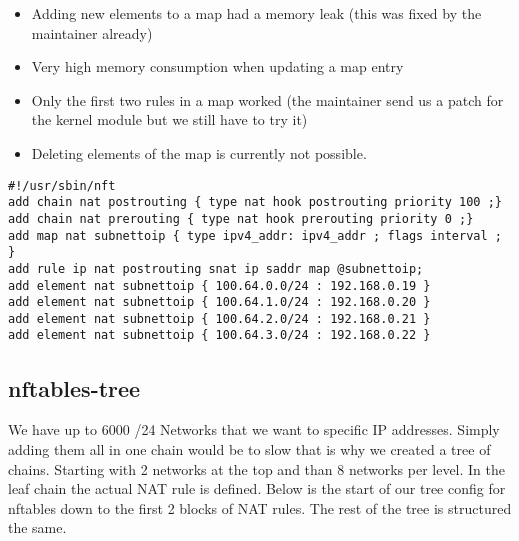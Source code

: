 \documentclass{report}
\begin{document}
\begin{itemize}
\itemsep1pt\parskip0pt
\item
  Adding new elements to a map had a memory leak (this was fixed by the
  maintainer already)
\item
  Very high memory consumption when updating a map entry
\item
  Only the first two rules in a map worked (the maintainer send us a
  patch for the kernel module but we still have to try it)
\item
  Deleting elements of the map is currently not possible.
\end{itemize}

\begin{verbatim}
#!/usr/sbin/nft
add chain nat postrouting { type nat hook postrouting priority 100 ;}
add chain nat prerouting { type nat hook prerouting priority 0 ;}
add map nat subnettoip { type ipv4_addr: ipv4_addr ; flags interval ; }
add rule ip nat postrouting snat ip saddr map @subnettoip;
add element nat subnettoip { 100.64.0.0/24 : 192.168.0.19 }
add element nat subnettoip { 100.64.1.0/24 : 192.168.0.20 }
add element nat subnettoip { 100.64.2.0/24 : 192.168.0.21 }
add element nat subnettoip { 100.64.3.0/24 : 192.168.0.22 }
\end{verbatim}

\subsection{nftables-tree}

We have up to 6000 /24 Networks that we want to specific IP addresses.
Simply adding them all in one chain would be to slow that is why we
created a tree of chains. Starting with 2 networks at the top and than 8
networks per level. In the leaf chain the actual NAT rule is defined.
Below is the start of our tree config for nftables down to the first 2
blocks of NAT rules. The rest of the tree is structured the same.
\end{document}
